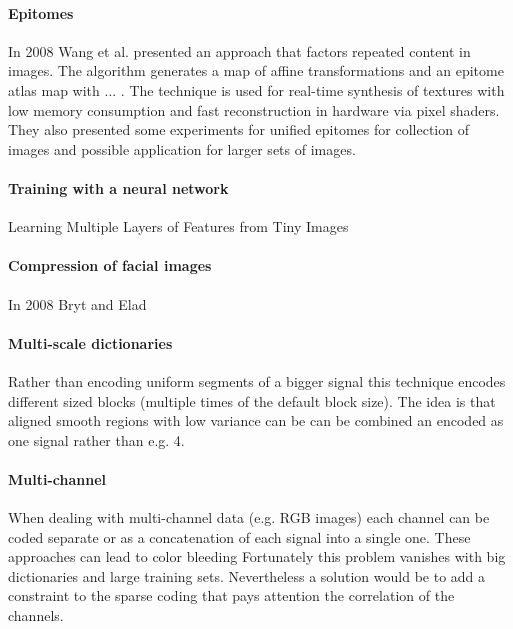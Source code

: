 \paragraph{Epitomes} In 2008 Wang et al.\cite{Wang2008a} presented
an approach that factors repeated content in images. The algorithm generates 
a map of affine transformations and an epitome atlas map with ... . The
technique is used for real-time synthesis of textures with low memory
consumption and  fast reconstruction in hardware via pixel shaders. They also
presented some experiments for unified epitomes for collection of images and
possible application for larger sets of images. 

\paragraph{Training with a neural network}
Learning Multiple Layers of Features from Tiny Images \cite{Krizhevsky2009}

\paragraph{Compression of facial images}
In 2008 Bryt and Elad \cite{Bryt2008} 

\paragraph{Multi-scale dictionaries}
Rather than encoding uniform segments of a bigger signal this technique
encodes different sized blocks (multiple times of the default block size). The
idea is that aligned smooth regions with low variance can be can be combined an
encoded as one signal rather than e.g. 4. \cite{saprioSlides}\cite{Mairal2007}


\paragraph{Multi-channel}
When dealing with multi-channel data (e.g. RGB images) each channel can be coded
separate or as a concatenation of each signal into a single one. These
approaches can lead to color bleeding \cite{mairal08sparse} 
Fortunately this problem vanishes with big dictionaries and large training sets.
\cite{mairal08sparse} Nevertheless a solution would be to add a constraint to
the sparse coding that pays attention the correlation of the channels. 

